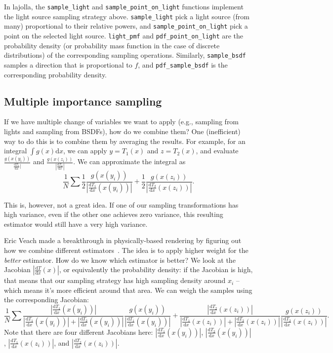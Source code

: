 In lajolla, the \lstinline{sample_light} and \lstinline{sample_point_on_light} functions implement the light source sampling strategy above. \lstinline{sample_light} pick a light source (from many) proportional to their relative powers, and \lstinline{sample_point_on_light} pick a point on the selected light source. \lstinline{light_pmf} and \lstinline{pdf_point_on_light} are the probability density (or probability mass function in the case of discrete distributions) of the corresponding sampling operations. Similarly, \lstinline{sample_bsdf} samples a direction that is proportional to $f$, and \lstinline{pdf_sample_bsdf} is the corresponding probability density.

\subsection{Multiple importance sampling}

If we have multiple change of variables we want to apply (e.g., sampling from lights and sampling from BSDFs), how do we combine them? One (inefficient) way to do this is to combine them by averaging the results. For example, for an integral $\int g(x) \mathrm{d}x$, we can apply $y = T_1(x)$ and $z = T_2(x)$, and evaluate $\frac{g(x(y_i))}{
\frac{\mathrm{d}T_1}{\mathrm{d}x}|}$ and $\frac{g(x(z_i))}{|\frac{\mathrm{d}T_2}{\mathrm{d}x}|}$. We can approximate the integral as
\begin{equation}
\frac{1}{N} \sum
\frac{1}{2} \frac{g(x(y_i))}{|\frac{\mathrm{d}T_1}{\mathrm{d}x}(x(y_i))|} + 
\frac{1}{2} \frac{g(x(z_i))}{|\frac{\mathrm{d}T_2}{\mathrm{d}x}(x(z_i))|}.
\end{equation}

This is, however, not a great idea. If one of our sampling transformations has high variance, even if the other one achieves zero variance, this resulting estimator would still have a very high variance.

Eric Veach made a breakthrough in physically-based rendering by figuring out how we combine different estimators~\cite{Veach:1995:OCS}. The idea is to apply higher weight for the \emph{better} estimator. How do we know which estimator is better? We look at the Jacobian $|\frac{\mathrm{d}T}{\mathrm{d}x}(x)|$, or equivalently the probability density: if the Jacobian is high, that means that our sampling strategy has high sampling density around $x_i$ -- which means it's more efficient around that area. We can weigh the samples using the corresponding Jacobian:
\begin{equation}
\frac{1}{N} \sum
\frac{|\frac{\mathrm{d}T_1}{\mathrm{d}x}(x(y_i))|}{|\frac{\mathrm{d}T_1}{\mathrm{d}x}(x(y_i))| + |\frac{\mathrm{d}T_2}{\mathrm{d}x}(x(y_i))|}
\frac{g(x(y_i))}{|\frac{\mathrm{d}T_1}{\mathrm{d}x}(x(y_i))|} + 
\frac{|\frac{\mathrm{d}T_2}{\mathrm{d}x}(x(z_i))|}{|\frac{\mathrm{d}T_1}{\mathrm{d}x}(x(z_i))| + |\frac{\mathrm{d}T_2}{\mathrm{d}x}(x(z_i))|}
\frac{g(x(z_i))}{|\frac{\mathrm{d}T_2}{\mathrm{d}x}(x(z_i))|}.
\end{equation}
Note that there are four different Jacobians here: $|\frac{\mathrm{d}T_1}{\mathrm{d}x}(x(y_i))|$, $|\frac{\mathrm{d}T_2}{\mathrm{d}x}(x(y_i))|$, $|\frac{\mathrm{d}T_1}{\mathrm{d}x}(x(z_i))|$, and $|\frac{\mathrm{d}T_2}{\mathrm{d}x}(x(z_i))|$.


